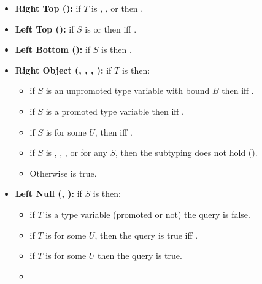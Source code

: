 \documentclass[makeidx]{article}
\begin{document}
{\begin{itemize}
\item
  \textbf{Right Top (\SrnRightTop):}
  if $T$ is , \DYNAMIC, or \VOID{} then .
\item
  \textbf{Left Top (\SrnLeftTop):}
  if $S$ is \DYNAMIC{} or \VOID{}
  then  if{}f .
\item
  \textbf{Left Bottom (\SrnBottom):}
  if $S$ is  then .
\item
  \textbf{Right Object (\SrnLeftVariableBound*, \SrnLeftPromotedVariableTwo*, %
    \SrnLeftFutureOr*, \SrnRightObjectFour):}
  if $T$ is  then:
  \begin{itemize}
  \item
    if $S$ is an unpromoted type variable with bound $B$
    then  if{}f .
  \item
    if $S$ is a promoted type variable 
    then  if{}f .
  \item
    if $S$ is  for some $U$,
    then  if{}f .
  \item
    if $S$ is , \DYNAMIC, \VOID, or  for any $S$,
    then the subtyping does not hold
    ().
  \item
    Otherwise  is true.
  \end{itemize}
\item
  \textbf{Left Null (\SrnRightFutureOrB*, \SrnNullOne):}
  if $S$ is  then:
  \begin{itemize}
  \item
    if $T$ is a type variable (promoted or not) the query is false.
  \item
    if $T$ is  for some $U$,
    then the query is true if{}f .
  \item
    if $T$ is  for some $U$ then the query is true.
  \item

\end{itemize}
\end{itemize}}
\end{document}
